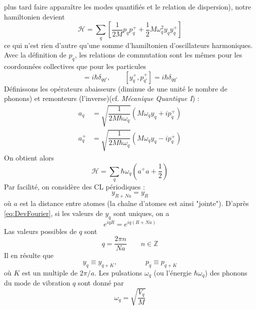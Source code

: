 plus tard faire apparaître les modes quantifiés et le relation de dispersion), 
notre hamiltonien devient
\begin{equation}
\mathcal{H} = \sum_q \left[\frac{1}{2M}p_qp_q^+ + \dfrac{1}{2}M\omega_q^2 y_q
y_q^+\right]
\end{equation}
ce qui n'est rien d'autre qu'une somme d'hamiltonien d'oscillateurs harmoniques.\\
Avec la définition de $p_q$, les relations de commutation sont les mêmes pour 
les coordonnées collectives que pour les particules
\begin{equation}
[y_q,p_{q'}] = i\hbar\delta_{qq'},\qquad [y_q^+,p_{q'}^+] = i\hbar\delta_{qq'}
\end{equation}
Définissons les opérateurs abaisseurs (diminue de une unité le nombre de 
phonons) et remonteurs (l'inverse)(cf. \textit{Mécanique Quantique I}) :
\begin{equation}
\begin{array}{ll}
a_q &= \displaystyle \sqrt{\dfrac{1}{2M\hbar\omega_q}}(M\omega_qy_q+ip_q^+)\\
a_q^+ &= \displaystyle \sqrt{\dfrac{1}{2M\hbar\omega_q}}(M\omega_qy_q-ip_q^+)
\end{array}
\end{equation}
On obtient alors
\begin{equation}
\mathcal{H} = \sum_q \hbar \omega_q (a^+a+\frac{1}{2})
\end{equation}
Par facilité, on considère des CL périodiques :
\begin{equation}
y_{R+Na} = y_R
\end{equation}
où $a$ est la distance entre atomes (la chaîne d'atomes est ainsi "jointe"). 
D'après \autoref{eq:DevFourier}, si les valeurs de $y_q$ sont uniques, on a 
\begin{equation}
e^{iqR} = e^{iq(R+Na)}
\end{equation} 
Las valeurs possibles de $q$ sont 
\begin{equation}
q = \dfrac{2\pi n}{Na}\qquad n \in \mathbb{Z}
\end{equation}
Il en résulte que 
\begin{equation}
y_q \equiv y_{q+K},\qquad\qquad p_q \equiv p_{q+K}
\end{equation}
où $K$ est un multiple de $2\pi/a$. Les pulsations $\omega_q$ (ou l'énergie 
$\hbar\omega_q$) des phonons du mode de vibration $q$ sont donné par 
\begin{equation}
\omega_q = \sqrt{\dfrac{V_q}{M}}
\end{equation}

